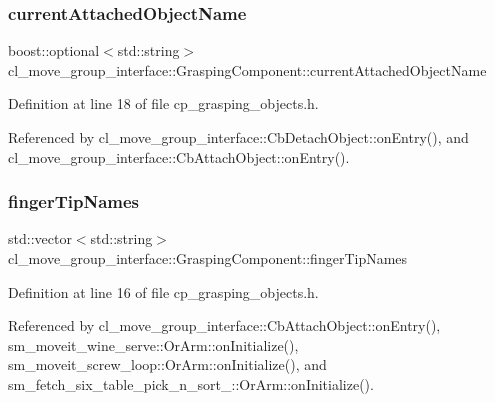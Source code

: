 \subsubsection{\texorpdfstring{current\+Attached\+Object\+Name}{currentAttachedObjectName}}
{\footnotesize\ttfamily boost\+::optional$<$std\+::string$>$ cl\+\_\+move\+\_\+group\+\_\+interface\+::\+Grasping\+Component\+::current\+Attached\+Object\+Name}



Definition at line 18 of file cp\+\_\+grasping\+\_\+objects.\+h.



Referenced by cl\+\_\+move\+\_\+group\+\_\+interface\+::\+Cb\+Detach\+Object\+::on\+Entry(), and cl\+\_\+move\+\_\+group\+\_\+interface\+::\+Cb\+Attach\+Object\+::on\+Entry().

\mbox{\label{classcl__move__group__interface_1_1GraspingComponent_afc08a0abc3220a377d0bbf798383a42a}} 
\subsubsection{\texorpdfstring{finger\+Tip\+Names}{fingerTipNames}}
{\footnotesize\ttfamily std\+::vector$<$std\+::string$>$ cl\+\_\+move\+\_\+group\+\_\+interface\+::\+Grasping\+Component\+::finger\+Tip\+Names}



Definition at line 16 of file cp\+\_\+grasping\+\_\+objects.\+h.



Referenced by cl\+\_\+move\+\_\+group\+\_\+interface\+::\+Cb\+Attach\+Object\+::on\+Entry(), sm\+\_\+moveit\+\_\+wine\+\_\+serve\+::\+Or\+Arm\+::on\+Initialize(), sm\+\_\+moveit\+\_\+screw\+\_\+loop\+::\+Or\+Arm\+::on\+Initialize(), and sm\+\_\+fetch\+\_\+six\+\_\+table\+\_\+pick\+\_\+n\+\_\+sort\+\_\+::\+Or\+Arm\+::on\+Initialize().

\mbox{\label{classcl__move__group__interface_1_1GraspingComponent_a5e0364a3b76738fb263b11c4e1ef56cc}} 
